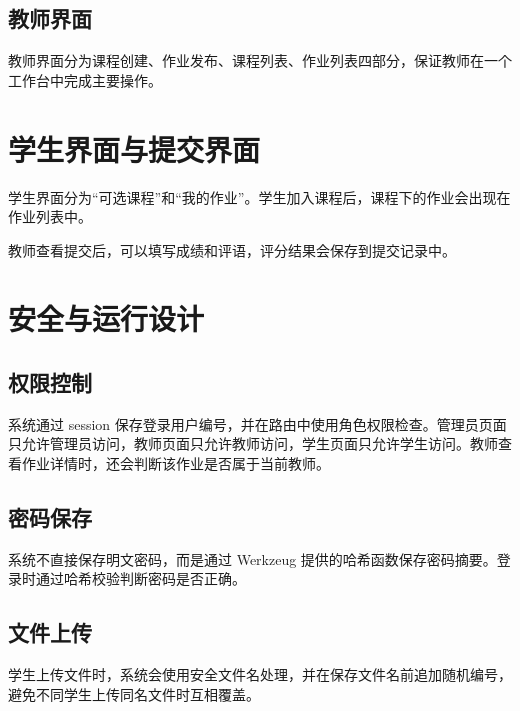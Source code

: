 \documentclass[UTF8,12pt]{ctexart}
\begin{document}

\subsection{教师界面}

教师界面分为课程创建、作业发布、课程列表、作业列表四部分，保证教师在一个工作台中完成主要操作。


\newpage

\section{学生界面与提交界面}

学生界面分为“可选课程”和“我的作业”。学生加入课程后，课程下的作业会出现在作业列表中。


教师查看提交后，可以填写成绩和评语，评分结果会保存到提交记录中。


\newpage

\section{安全与运行设计}

\subsection{权限控制}

系统通过 session 保存登录用户编号，并在路由中使用角色权限检查。管理员页面只允许管理员访问，教师页面只允许教师访问，学生页面只允许学生访问。教师查看作业详情时，还会判断该作业是否属于当前教师。

\subsection{密码保存}

系统不直接保存明文密码，而是通过 Werkzeug 提供的哈希函数保存密码摘要。登录时通过哈希校验判断密码是否正确。

\subsection{文件上传}

学生上传文件时，系统会使用安全文件名处理，并在保存文件名前追加随机编号，避免不同学生上传同名文件时互相覆盖。
\end{document}
